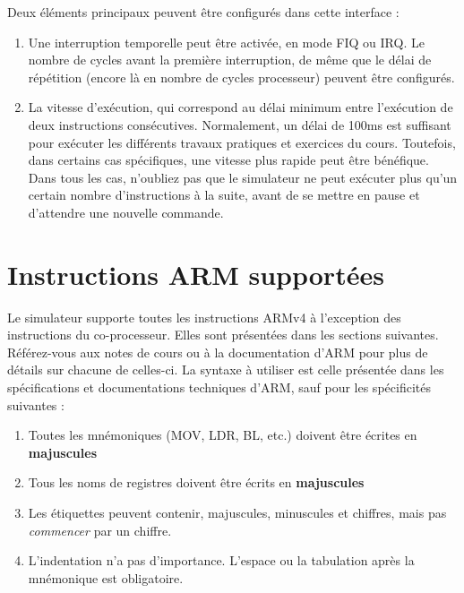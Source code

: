 \documentclass{tufte-handout}
\begin{document}
Deux éléments principaux peuvent être configurés dans cette interface :
\begin{enumerate}
	\item Une interruption temporelle peut être activée, en mode FIQ ou IRQ. Le nombre de cycles avant la première interruption, de même que le délai de répétition (encore là en nombre de cycles processeur) peuvent être configurés.
	\item La vitesse d'exécution, qui correspond au délai minimum entre l'exécution de deux instructions consécutives. Normalement, un délai de 100ms est suffisant pour exécuter les différents travaux pratiques et exercices du cours. Toutefois, dans certains cas spécifiques, une vitesse plus rapide peut être bénéfique. Dans tous les cas, n'oubliez pas que le simulateur ne peut exécuter plus qu'un certain nombre d'instructions à la suite, avant de se mettre en pause et d'attendre une nouvelle commande.
\end{enumerate}

\clearpage
\section{Instructions ARM supportées}

Le simulateur supporte toutes les instructions ARMv4 à l'exception des instructions du co-processeur. Elles sont présentées dans les sections suivantes. Référez-vous aux notes de cours ou à la documentation d'ARM pour plus de détails sur chacune de celles-ci. La syntaxe à utiliser est celle présentée dans les spécifications et documentations techniques d'ARM, sauf pour les spécificités suivantes :
\begin{enumerate}
	\item Toutes les mnémoniques (MOV, LDR, BL, etc.) doivent être écrites en \textbf{majuscules}
	\item Tous les noms de registres doivent être écrits en \textbf{majuscules}
	\item Les étiquettes peuvent contenir, majuscules, minuscules et chiffres, mais pas \textit{commencer} par un chiffre.
	\item L'indentation n'a pas d'importance. L'espace ou la tabulation après la mnémonique est obligatoire.

\end{enumerate}
\end{document}

